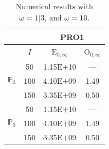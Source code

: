 \begin{table}[H]
\caption{Numerical results with $\omega=1|3$, and $\omega=10$.}
\setlength{\tabcolsep}{5pt}
\centering
\begin{tabular}{@{}l c c c@{}}
\toprule
 &  & \multicolumn{2}{c}{PRO1}\\
\midrule
 & $I$ & E$_{0,\infty}$ & O$_{0,\infty}$\\
\midrule
\multirow{3}{*}{$\mathbb{P}_{3}$}
 & 50 & 1.15E$+$10 & ---\\
 & 100 & 4.10E$+$09 & 1.49\\
 & 150 & 3.35E$+$09 & 0.50\\
\midrule
\multirow{3}{*}{$\mathbb{P}_{3}$}
 & 50 & 1.15E$+$10 & ---\\
 & 100 & 4.10E$+$09 & 1.49\\
 & 150 & 3.35E$+$09 & 0.50\\
\bottomrule
\end{tabular}
\label{Table:PRO:test_01_01_test1_pro2}
\end{table}
